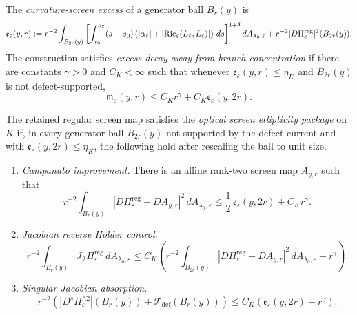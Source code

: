 \begin{definition}\label{def:CurvatureScreenExcess}
The \emph{curvature-screen excess} of a generator ball $B_r(y)$ is
\[
    \mathfrak e_{\varepsilon}(y,r)
    :=
    r^{-2}
    \int_{B_{2r}(y)}
    \left[
        \int_{s_0}^{s_{\mathcal{I}}}
        (s-s_0)
        \left(
            |\alpha_\varepsilon|
            +
            |\mathrm{Ric}_\varepsilon(L_\varepsilon,L_\varepsilon)|
        \right)\,ds
    \right]^{1+\delta}
    dA_{\lambda_0,\varepsilon}
    +
    r^{-2}|D\Pi_{\varepsilon}^{\mathrm{reg}}|^2(B_{2r}(y)).
\]
The construction satisfies \emph{excess decay away from branch concentration} if there are constants $\gamma>0$ and $C_K<\infty$ such that whenever $\mathfrak e_{\varepsilon}(y,r)\le\eta_K$ and $B_{2r}(y)$ is not defect-supported,
\[
    \mathfrak m_{\varepsilon}(y,r)
    \le
    C_K r^\gamma
    +
    C_K \mathfrak e_{\varepsilon}(y,2r).
\]
\end{definition}

\begin{definition}\label{def:OpticalScreenEllipticityPackage}
The retained regular screen map satisfies the \emph{optical screen ellipticity package} on $K$ if, in every generator ball $B_{2r}(y)$ not supported by the defect current and with $\mathfrak e_\varepsilon(y,2r)\le\eta_K$, the following hold after rescaling the ball to unit size.
\begin{enumerate}
    \item \emph{Campanato improvement.} There is an affine rank-two screen map $A_{y,r}$ such that
    \[
        r^{-2}\int_{B_r(y)}
        |D\Pi_\varepsilon^{\mathrm{reg}}-DA_{y,r}|^2\,dA_{\lambda_0,\varepsilon}
        \le
        \frac12\,\mathfrak e_\varepsilon(y,2r)
        +
        C_K r^\gamma .
    \]
    \item \emph{Jacobian reverse H\"older control.}
    \[
        r^{-2}\int_{B_r(y)}
        J_{\mathscr I}\Pi_\varepsilon^{\mathrm{reg}}\,dA_{\lambda_0,\varepsilon}
        \le
        C_K
        \left(
            r^{-2}\int_{B_{2r}(y)}
            |D\Pi_\varepsilon^{\mathrm{reg}}-DA_{y,r}|^2\,dA_{\lambda_0,\varepsilon}
            +
            r^\gamma
        \right).
    \]
    \item \emph{Singular-Jacobian absorption.}
    \[
        r^{-2}
        \left(
            |D^s\Pi_\varepsilon^{\wedge 2}|(B_r(y))
            +
            \mathcal T_{\mathrm{def}}(B_r(y))
        \right)
        \le
        C_K
        \left(
            \mathfrak e_\varepsilon(y,2r)+r^\gamma
        \right).
    \]
\end{enumerate}
\end{definition}

